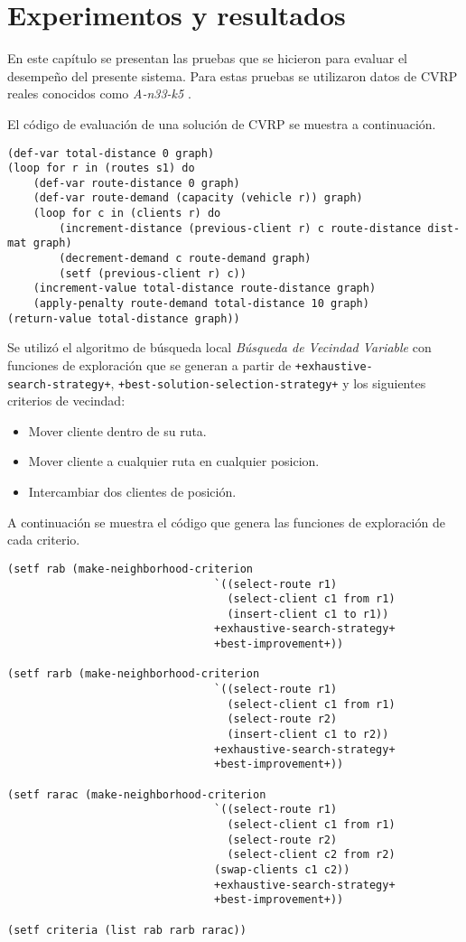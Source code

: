\chapter{Experimentos y resultados}\label{chapter:Results}

En este capítulo se presentan las pruebas que se hicieron para evaluar el desempeño del presente sistema. Para estas pruebas se utilizaron datos de CVRP reales conocidos como \textit{A-n33-k5} \cite{Data}. 

El código de evaluación de una solución de CVRP se muestra a continuación.

\begin{lstlisting}
(def-var total-distance 0 graph)
(loop for r in (routes s1) do
	(def-var route-distance 0 graph)
	(def-var route-demand (capacity (vehicle r)) graph) 
	(loop for c in (clients r) do
		(increment-distance (previous-client r) c route-distance dist-mat graph)
		(decrement-demand c route-demand graph) 
		(setf (previous-client r) c))
	(increment-value total-distance route-distance graph)
	(apply-penalty route-demand total-distance 10 graph) 
(return-value total-distance graph))
\end{lstlisting}

Se utilizó el algoritmo de búsqueda local \textit{Búsqueda de Vecindad Variable} \cite{mladenovic1995variable} con funciones de exploración que se generan a partir de \texttt{+exhaustive-\\search-strategy+}, \texttt{+best-solution-selection-strategy+} y los siguientes criterios de vecindad:

\begin{itemize}
	\item Mover cliente dentro de su ruta.
	\item Mover cliente a cualquier ruta en cualquier posicion.
	\item Intercambiar dos clientes de posición.
\end{itemize}

A continuación se muestra el código que genera las funciones de exploración de cada criterio.

\begin{lstlisting}
(setf rab (make-neighborhood-criterion 
								`((select-route r1)
								  (select-client c1 from r1)
								  (insert-client c1 to r1))
								+exhaustive-search-strategy+ 
								+best-improvement+))

(setf rarb (make-neighborhood-criterion 
								`((select-route r1)
								  (select-client c1 from r1)
								  (select-route r2)
								  (insert-client c1 to r2))
								+exhaustive-search-strategy+ 
								+best-improvement+))

(setf rarac (make-neighborhood-criterion 
								`((select-route r1)
								  (select-client c1 from r1)
								  (select-route r2)
								  (select-client c2 from r2)
								(swap-clients c1 c2))
								+exhaustive-search-strategy+ 
								+best-improvement+))

(setf criteria (list rab rarb rarac))

\end{lstlisting}

